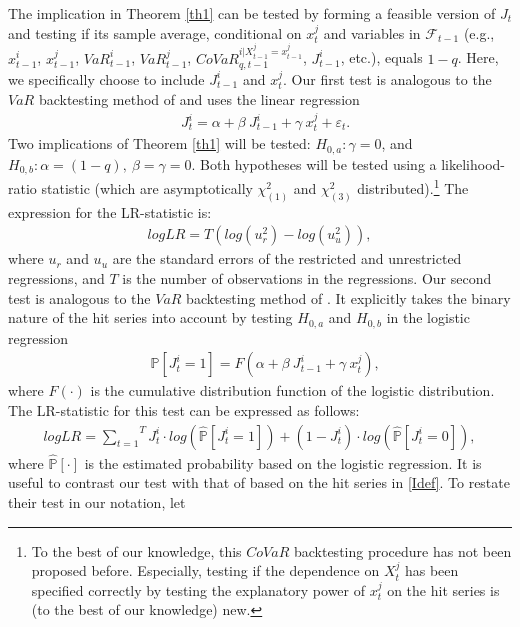 \documentclass[12pt]{article}
\begin{document}
\noindent The implication in Theorem \ref{th1} can be tested by forming a feasible version of $J_t$ and testing if its sample average, conditional on $x_t^j$ and variables in  $\mathcal{F}_{t-1}$ (e.g., $x^i_{t-1}$, $x^j_{t-1}$, $VaR^i_{t-1}$, $VaR^j_{t-1}$, $CoVaR_{q,t-1}^{i|X^{j}_{t-1} = x^j_{t-1}}$, $J^i_{t-1}$, etc.), equals $1-q$. Here, we specifically choose to include $J^i_{t-1}$ and $x^j_t$. Our first test is analogous to the $VaR$ backtesting method of \citet{engle} and uses the linear regression
\begin{align}
& J^i_t=\alpha+\beta\ J^i_{t-1} + \gamma\ x^j_{t} + \varepsilon_t  .
\end{align}
 Two implications of Theorem \ref{th1} will be tested: $H_{0, a}:\gamma=0$, and $H_{0, b}:\alpha=(1-q),\ \beta=\gamma=0$. Both hypotheses will be tested using a likelihood-ratio statistic (which are asymptotically $\chi^2_{(1)}$ and $\chi^2_{(3)}$  distributed).\footnote{To the best of our knowledge, this $CoVaR$ backtesting procedure has not been proposed before. Especially, testing if the dependence on $X^j_t$ has been specified correctly by testing the explanatory power of $x^j_t$ on the hit series is (to the best of our knowledge) new. } The expression for the LR-statistic is:
 \begin{align}
 logLR = T \left( log(u^2_r ) -  log(u^2_u )  \right) ,
 \end{align}
\noindent where $u_r$ and $u_u$ are the standard errors of the restricted and unrestricted regressions, and $T$ is the number of observations in the regressions. Our second test is analogous to the $VaR$ backtesting method of \citet{nonlineartest}. It explicitly takes the binary nature of the hit series  into account by testing $H_{0, a}$ and $H_{0, b}$ in the logistic regression
\begin{align}
& \mathbb{P}\left[J^i_t=1\right]=F(\alpha+\beta\ J^i_{t-1} + \gamma\ x^j_{t} ) ,
\end{align}
where $F\left(\cdot\right)$ is the cumulative distribution function of the logistic distribution. The LR-statistic for this test can be expressed as follows:
\begin{align}
logLR = \overset{T}{\underset{t=1}{\sum}} J^i_t \cdot log\left(\hat{\mathbb{P}}\left[J^i_t=1\right]\right)+\left(1-J^i_t\right) \cdot log\left(\hat{\mathbb{P}}\left[J^i_t=0\right]\right),
\end{align}
\noindent where $\hat{\mathbb{P}}\left[\cdot\right]$ is the estimated probability based on the logistic regression. It is useful to contrast our test with that of \citet{girardi} based on the hit series in \eqref{Idef}. To restate their test in our notation, let
\end{document}
